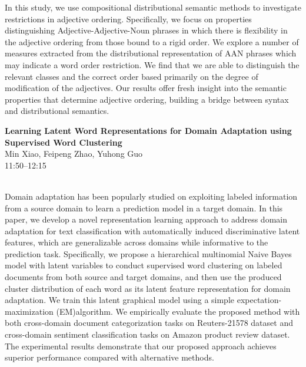 \documentclass[twoside,makeidx]{book}
\begin{document}
\nopagebreak%
\noindent%
{\small In this study, we use compositional distributional semantic methods to investigate restrictions in adjective ordering. Specifically, we focus on properties distinguishing Adjective-Adjective-Noun phrases in which there is flexibility in the adjective ordering from those bound to a rigid order. We explore a number of measures extracted from the distributional representation of AAN phrases which may indicate a word order restriction. We find that we are able to distinguish the relevant classes and the correct order based primarily on the degree of modification of the adjectives. Our results offer fresh insight into the semantic properties that determine adjective ordering, building a bridge between syntax and distributional semantics.}
\par\vspace{2em}\noindent%
\begin{minipage}{\linewidth}%
\begin{center}
\textbf{\normalsize Learning Latent Word Representations for Domain Adaptation using Supervised Word Clustering}\\
\normalsize  Min Xiao,  Feipeng Zhao,  Yuhong Guo\\
{\small 11:50--12:15}\\
\end{center}
\end{minipage}\\[0.5em]
\nopagebreak%
\noindent%
{\small Domain adaptation has been popularly studied on exploiting labeled information from a source domain to learn a prediction model in a target domain. In this paper, we develop a novel representation learning approach to address domain adaptation for text classification with automatically induced discriminative latent features, which are generalizable across domains while informative to the prediction task. Specifically, we propose a hierarchical multinomial Naive Bayes model with latent variables to conduct supervised word clustering on labeled documents from both source and target domains, and then use the produced cluster distribution of each word as its latent feature representation for domain adaptation. We train this latent graphical model using a simple expectation-maximization (EM)algorithm. We empirically evaluate the proposed method with both cross-domain document categorization tasks on Reuters-21578 dataset and cross-domain sentiment classification tasks on Amazon product review dataset. The experimental results demonstrate that our proposed approach achieves superior performance compared with alternative methods.}
\end{document}
